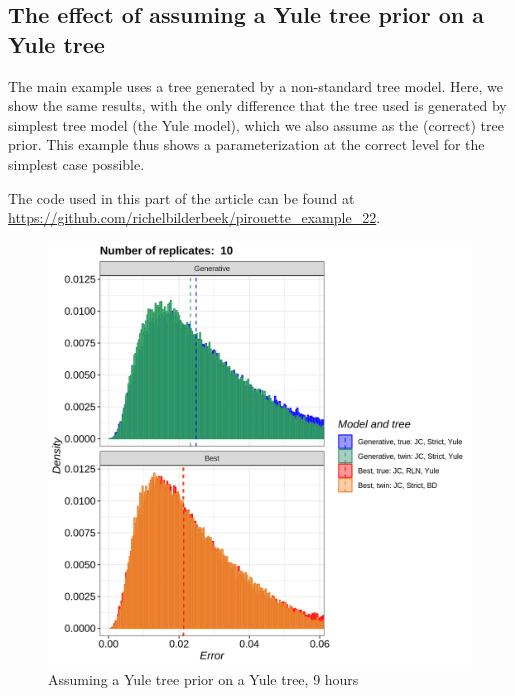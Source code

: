 \subsection{The effect of assuming a Yule tree prior on a Yule tree}
\label{subsec:simplest_correct_parameterization}

The main example uses a tree generated by a non-standard tree model.
Here, we show the same results, with the only difference that
the tree used is generated by simplest tree model (the Yule model),
which we also assume as the (correct) tree prior.
This example thus shows a parameterization at the correct level for the
simplest case possible.

The code used in this part of the article can be found at 
\url{https://github.com/richelbilderbeek/pirouette_example_22}.

\begin{figure}[H]
  \includegraphics[width=\textwidth]{pirouette_example_22/errors.png}
  \caption{Assuming a Yule tree prior on a Yule tree, 9 hours}
\end{figure}

